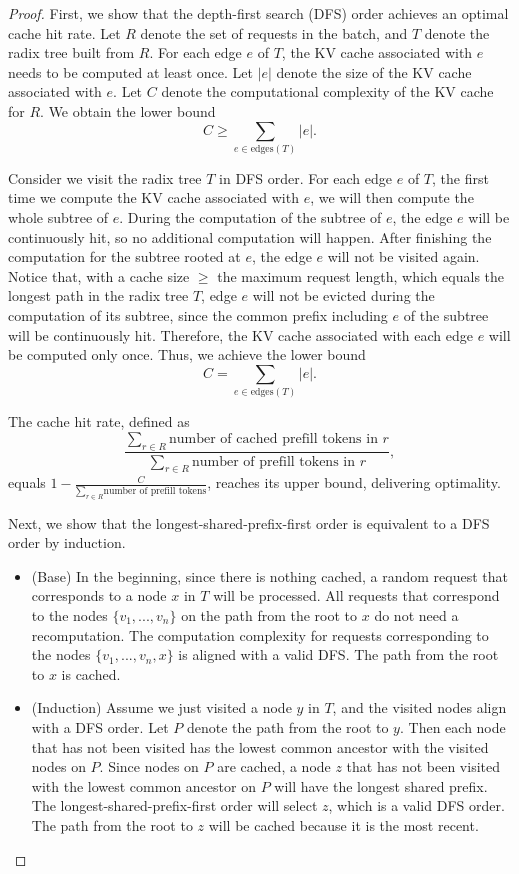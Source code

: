 \optimal*
\begin{proof}
First, we show that the depth-first search (DFS) order achieves an optimal cache hit rate.
Let \( R \) denote the set of requests in the batch, and \( T \) denote the radix tree built from \( R \).
For each edge \( e \) of \( T \), the KV cache associated with \( e \) needs to be computed at least once.
Let \( |e| \) denote the size of the KV cache associated with \( e \).
Let \( C \) denote the computational complexity of the KV cache for \( R \).
We obtain the lower bound
\[
C \geq \sum_{e \in \text{edges}(T)} |e|.
\]

Consider we visit the radix tree \( T \) in DFS order.
For each edge \( e \) of \( T \), the first time we compute the KV cache associated with \( e \), we will then compute the whole subtree of \( e \).
During the computation of the subtree of \( e \), the edge \( e \) will be continuously hit, so no additional computation will happen. After finishing the computation for the subtree rooted at \( e \), the edge \( e \) will not be visited again.
Notice that, with a cache size \(\geq\) the maximum request length, which equals the longest path in the radix tree \( T \), edge \( e \) will not be evicted during the computation of its subtree, since the common prefix including \( e \) of the subtree will be continuously hit.
Therefore, the KV cache associated with each edge \( e \) will be computed only once. Thus, we achieve the lower bound
\[
C = \sum_{e \in \text{edges}(T)} |e|.
\]

The cache hit rate, defined as
\[
\frac{\sum_{r\in R}\text{number of cached prefill tokens in $r$}}{\sum_{r\in R}\text{number of prefill tokens in $r$}},
\]
equals \(1 - \frac{C}{\sum_{r\in R}\text{number of prefill tokens}}\), reaches its upper bound, delivering optimality.

Next, we show that the longest-shared-prefix-first order is equivalent to a DFS order by induction.
\begin{itemize}
    \item (Base) In the beginning, since there is nothing cached, a random request that corresponds to a node $x$ in $T$ will be processed. All requests that correspond to the nodes $\{v_1, ..., v_n\}$ on the path from the root to $x$ do not need a recomputation. The computation complexity for requests corresponding to the nodes $\{v_1,..., v_n, x\}$ is aligned with a valid DFS. The path from the root to $x$ is cached.

    \item (Induction) Assume we just visited a node $y$ in $T$, and the visited nodes align with a DFS order.
    Let $P$ denote the path from the root to $y$.
    Then each node that has not been visited has the lowest common ancestor with the visited nodes on $P$.
    Since nodes on $P$ are cached, a node $z$ that has not been visited with the lowest common ancestor on $P$ will have the longest shared prefix.
    The longest-shared-prefix-first order will select $z$, which is a valid DFS order. The path from the root to $z$ will be cached because it is the most recent.
\end{itemize}
\end{proof}

